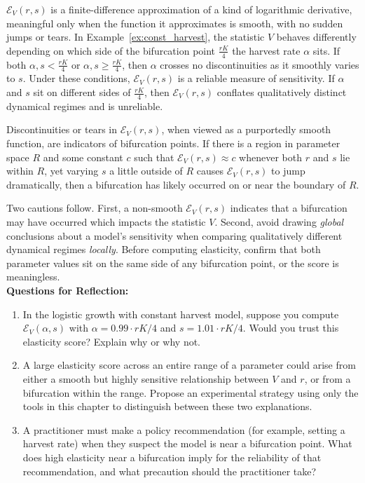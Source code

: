 $\mathcal{E}_{V}(r,s)$ is a finite-difference approximation of a kind of logarithmic derivative, meaningful only when the function it approximates is smooth, with no sudden jumps or tears. In Example~\ref{ex:const_harvest}, the statistic $V$ behaves differently depending on which side of the bifurcation point $\frac{rK}{4}$ the harvest rate $\alpha$ sits. If both $\alpha, s < \frac{rK}{4}$ or $\alpha, s \geq \frac{rK}{4}$, then $\alpha$ crosses no discontinuities as it smoothly varies to $s$. Under these conditions, $\mathcal{E}_{V}(r,s)$ is a reliable measure of sensitivity. If $\alpha$ and $s$ sit on different sides of $\frac{rK}{4}$, then $\mathcal{E}_{V}(r,s)$ conflates qualitatively distinct dynamical regimes and is unreliable.

Discontinuities or tears in $\mathcal{E}_{V}(r,s)$, when viewed as a purportedly smooth function, are indicators of bifurcation points. If there is a region in parameter space $R$ and some constant $c$ such that $\mathcal{E}_{V}(r,s) \approx c$ whenever both $r$ and $s$ lie within $R$, yet varying $s$ a little outside of $R$ causes $\mathcal{E}_{V}(r,s)$ to jump dramatically, then a bifurcation has likely occurred on or near the boundary of $R$.

Two cautions follow. First, a non-smooth $\mathcal{E}_{V}(r,s)$ indicates that a bifurcation may have occurred which impacts the statistic $V$. Second, avoid drawing \textit{global} conclusions about a model's sensitivity when comparing qualitatively different dynamical regimes \textit{locally}. Before computing elasticity, confirm that both parameter values sit on the same side of any bifurcation point, or the score is meaningless.\\

\noindent \textup{{\bf Questions for Reflection:}}
\begin{enumerate}
\item In the logistic growth with constant harvest model, suppose you compute $\mathcal{E}_V(\alpha, s)$ with $\alpha = 0.99 \cdot rK/4$ and $s = 1.01 \cdot rK/4$. Would you trust this elasticity score? Explain why or why not.

\item A large elasticity score across an entire range of a parameter could arise from either a smooth but highly sensitive relationship between $V$ and $r$, or from a bifurcation within the range. Propose an experimental strategy using only the tools in this chapter to distinguish between these two explanations.

\item A practitioner must make a policy recommendation (for example, setting a harvest rate) when they suspect the model is near a bifurcation point. What does high elasticity near a bifurcation imply for the reliability of that recommendation, and what precaution should the practitioner take?
\end{enumerate}
